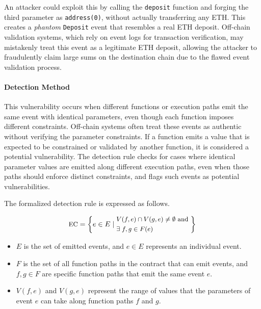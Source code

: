 An attacker could exploit this by calling the \texttt{deposit} function and forging the third parameter as \texttt{address(0)}, without actually transferring any ETH. This creates a \emph{phantom} \texttt{Deposit} event that resembles a real ETH deposit. Off-chain validation systems, which rely on event logs for transaction verification, may mistakenly treat this event as a legitimate ETH deposit, allowing the attacker to fraudulently claim large sums on the destination chain due to the flawed event validation process.


\paragraph{Detection Method}
This vulnerability occurs when different functions or execution paths emit the same event with identical parameters, even though each function imposes different constraints. Off-chain systems often treat these events as authentic without verifying the parameter constraints. If a function emits a value that is expected to be constrained or validated by another function, it is considered a potential vulnerability. The detection rule checks for cases where identical parameter values are emitted along different execution paths, even when those paths should enforce distinct constraints, and flags such events as potential vulnerabilities.


The formalized detection rule is expressed as follows.

\begin{equation}
\small
\text{EC} = \left\{
e \in E \mid
\begin{aligned}
  & V(f, e) \cap V(g, e) \neq \emptyset \text{ and } \\
  & \exists \; f, g \in F(e)
\end{aligned}
\right\}
\end{equation}


\begin{itemize}
    \item \( E \) is the set of emitted events, and \( e \in E \) represents an individual event.
    \item \( F \) is the set of all function paths in the contract that can emit events, and \( f, g \in F \) are specific function paths that emit the same event \( e \).
    \item \( V(f, e) \) and \( V(g, e) \) represent the range of values that the parameters of event \( e \) can take along function paths \( f \) and \( g \).
\end{itemize}


